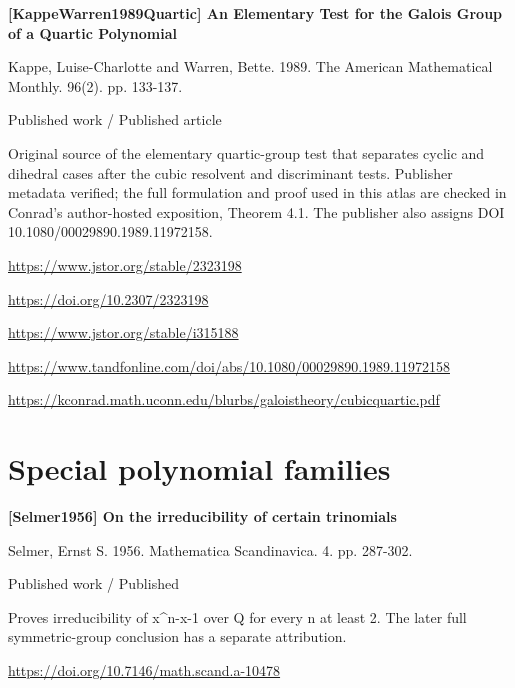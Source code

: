 \documentclass[11pt,a4paper,oneside,openany]{book}
\begin{document}
\vspace{9pt}
\hypertarget{ref:KappeWarren1989Quartic}{}
{\sffamily\bfseries\color{atlasgreen}[KappeWarren1989Quartic] An Elementary Test for the Galois Group of a Quartic Polynomial}\par
\color{black} Kappe, Luise-Charlotte and Warren, Bette. 1989. The American Mathematical Monthly. 96(2). pp. 133-137.\par
{\small\sffamily\color{atlasgold}Published work / Published article}\par
\color{black} Original source of the elementary quartic-group test that separates cyclic and dihedral cases after the cubic resolvent and discriminant tests. Publisher metadata verified; the full formulation and proof used in this atlas are checked in Conrad's author-hosted exposition, Theorem 4.1. The publisher also assigns DOI 10.1080/00029890.1989.11972158.\par
{\footnotesize\url{https://www.jstor.org/stable/2323198}}\par
{\footnotesize\url{https://doi.org/10.2307/2323198}}\par
{\footnotesize\url{https://www.jstor.org/stable/i315188}}\par
{\footnotesize\url{https://www.tandfonline.com/doi/abs/10.1080/00029890.1989.11972158}}\par
{\footnotesize\url{https://kconrad.math.uconn.edu/blurbs/galoistheory/cubicquartic.pdf}}\par
\vspace{9pt}
\section{Special polynomial families}
\hypertarget{ref:Selmer1956}{}
{\sffamily\bfseries\color{atlasgreen}[Selmer1956] On the irreducibility of certain trinomials}\par
\color{black} Selmer, Ernst S. 1956. Mathematica Scandinavica. 4. pp. 287-302.\par
{\small\sffamily\color{atlasgold}Published work / Published}\par
\color{black} Proves irreducibility of x\textasciicircum{}n-x-1 over Q for every n at least 2. The later full symmetric-group conclusion has a separate attribution.\par
{\footnotesize\url{https://doi.org/10.7146/math.scand.a-10478}}\par
\vspace{9pt}
\end{document}

